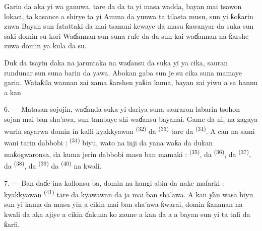 Garin da aka yi wa ganuwa, tare da  da
  ta yi masa
 wadda, bayan  mai tsawon lokaci, ta
kasance a shirye ta yi  Amma  da yunwa ta tilasta musu, sun yi ƙoƙarin 
zuwa  Bayan sun fatattaki 
da  mai tsanani kewaye da  masu ƙawanyar da
suka  sun saki  domin su kori
 Waɗannan sun  suna
rufe  da  da   sun kai waɗannan na ƙarshe zuwa
 domin  ya kula da su.

Duk da tsayin daka na jaruntaka na waɗansu  da suka
yi   ya cika, sauran rundunar sun
 suna barin  da yawa. Abokan gaba sun je su
cika  suna mamaye garin. Wataƙila wannan zai zama
ƙarshen yaƙin kuma, bayan  zai yiwu a sa hannu a
kan 

\VUsaut{4.4mm}
\VUsaut{2.8mm}

6. --- Matasan sojojin, waɗanda suka yi dariya suna sauraron labarin
tsohon sojan mai ban sha’awa, sun tambaye shi waɗansu bayanai. Game da
ni, na zagaya wurin sayarwa domin in kalli kyakkyawan  \textsuperscript{(32)} da  \textsuperscript{(33)} tare da
 \textsuperscript{(31)}. A can na sami wani tarin dabbobi :
 \textsuperscript{(34)} biyu, wato  na inji da  yana waƙa da dukan maƙogwaronsa,
da kuma jerin dabbobi masu ban mamaki : 
\textsuperscript{(35)}, da  \textsuperscript{(36)}, da 
\textsuperscript{(37)}, da  \textsuperscript{(38)}, da
 \textsuperscript{(39)} da  \textsuperscript{(40)} na kwali.

7. --- Ban daɗe ina kallonsu ba, domin na hangi abin da nake mafarki :
kyakkyawan  \textsuperscript{(41)} tare da
kyawawan  da  ja mai ban sha’awa. A kan
 ƴan wasa biyu sun yi kama da masu yin 
a cikin  mai ban sha’awa ƙwarai, domin ƙananan
 na kwali da aka ajiye a cikin ɗakuna ko zaune a kan
 da a  a bayan  sun yi ta tafi da ƙarfi.

